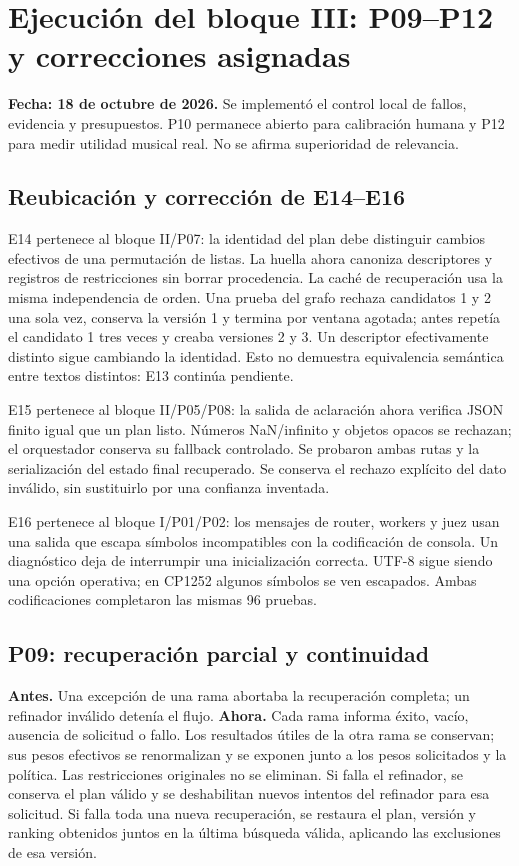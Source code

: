 \section{Ejecución del bloque III: P09--P12 y correcciones asignadas}
\label{sec:bloque3}
\textbf{Fecha: 18 de octubre de 2026.} Se implementó el control local de fallos,
evidencia y presupuestos. P10 permanece abierto para calibración humana y P12
para medir utilidad musical real. No se afirma superioridad de relevancia.

\subsection{Reubicación y corrección de E14--E16}
E14 pertenece al bloque II/P07: la identidad del plan debe distinguir cambios
efectivos de una permutación de listas. La huella ahora canoniza descriptores y
registros de restricciones sin borrar procedencia. La caché de recuperación usa
la misma independencia de orden. Una prueba del grafo rechaza candidatos 1 y 2
una sola vez, conserva la versión 1 y termina por ventana agotada; antes repetía
el candidato 1 tres veces y creaba versiones 2 y 3. Un descriptor efectivamente
distinto sigue cambiando la identidad. Esto no demuestra equivalencia semántica
entre textos distintos: E13 continúa pendiente.

E15 pertenece al bloque II/P05/P08: la salida de aclaración ahora verifica JSON
finito igual que un plan listo. Números NaN/infinito y objetos opacos se rechazan;
el orquestador conserva su fallback controlado. Se probaron ambas rutas y la
serialización del estado final recuperado. Se conserva el rechazo explícito del
dato inválido, sin sustituirlo por una confianza inventada.

E16 pertenece al bloque I/P01/P02: los mensajes de router, workers y juez usan
una salida que escapa símbolos incompatibles con la codificación de consola.
Un diagnóstico deja de interrumpir una inicialización correcta. UTF-8 sigue
siendo una opción operativa; en CP1252 algunos símbolos se ven escapados.
Ambas codificaciones completaron las mismas 96 pruebas.

\subsection{P09: recuperación parcial y continuidad}
\textbf{Antes.} Una excepción de una rama abortaba la recuperación completa;
un refinador inválido detenía el flujo. \textbf{Ahora.} Cada rama informa éxito,
vacío, ausencia de solicitud o fallo. Los resultados útiles de la otra rama se
conservan; sus pesos efectivos se renormalizan y se exponen junto a los pesos
solicitados y la política. Las restricciones originales no se eliminan.
Si falla el refinador, se conserva el plan válido y se deshabilitan nuevos
intentos del refinador para esa solicitud. Si falla toda una nueva recuperación,
se restaura el plan, versión y ranking obtenidos juntos en la última búsqueda
válida, aplicando las exclusiones de esa versión.

